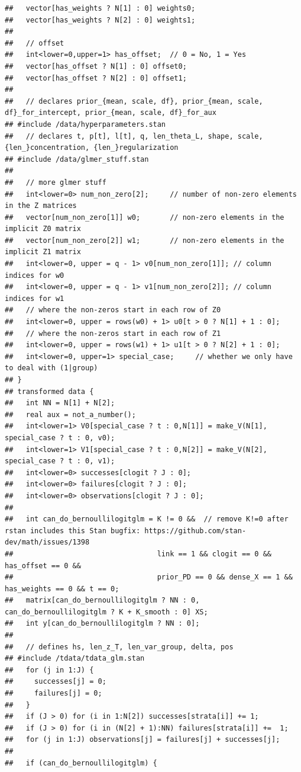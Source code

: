 \documentclass[
]{article}
\begin{document}
\begin{verbatim}
##   vector[has_weights ? N[1] : 0] weights0;
##   vector[has_weights ? N[2] : 0] weights1;
##   
##   // offset
##   int<lower=0,upper=1> has_offset;  // 0 = No, 1 = Yes
##   vector[has_offset ? N[1] : 0] offset0;
##   vector[has_offset ? N[2] : 0] offset1;
##   
##   // declares prior_{mean, scale, df}, prior_{mean, scale, df}_for_intercept, prior_{mean, scale, df}_for_aux
## #include /data/hyperparameters.stan
##   // declares t, p[t], l[t], q, len_theta_L, shape, scale, {len_}concentration, {len_}regularization
## #include /data/glmer_stuff.stan
## 
##   // more glmer stuff
##   int<lower=0> num_non_zero[2];     // number of non-zero elements in the Z matrices
##   vector[num_non_zero[1]] w0;       // non-zero elements in the implicit Z0 matrix
##   vector[num_non_zero[2]] w1;       // non-zero elements in the implicit Z1 matrix
##   int<lower=0, upper = q - 1> v0[num_non_zero[1]]; // column indices for w0
##   int<lower=0, upper = q - 1> v1[num_non_zero[2]]; // column indices for w1
##   // where the non-zeros start in each row of Z0
##   int<lower=0, upper = rows(w0) + 1> u0[t > 0 ? N[1] + 1 : 0];  
##   // where the non-zeros start in each row of Z1
##   int<lower=0, upper = rows(w1) + 1> u1[t > 0 ? N[2] + 1 : 0];  
##   int<lower=0, upper=1> special_case;     // whether we only have to deal with (1|group)
## }
## transformed data {
##   int NN = N[1] + N[2];
##   real aux = not_a_number();
##   int<lower=1> V0[special_case ? t : 0,N[1]] = make_V(N[1], special_case ? t : 0, v0);
##   int<lower=1> V1[special_case ? t : 0,N[2]] = make_V(N[2], special_case ? t : 0, v1);
##   int<lower=0> successes[clogit ? J : 0];
##   int<lower=0> failures[clogit ? J : 0];
##   int<lower=0> observations[clogit ? J : 0];
## 
##   int can_do_bernoullilogitglm = K != 0 &&  // remove K!=0 after rstan includes this Stan bugfix: https://github.com/stan-dev/math/issues/1398
##                                  link == 1 && clogit == 0 && has_offset == 0 && 
##                                  prior_PD == 0 && dense_X == 1 && has_weights == 0 && t == 0;
##   matrix[can_do_bernoullilogitglm ? NN : 0, can_do_bernoullilogitglm ? K + K_smooth : 0] XS;
##   int y[can_do_bernoullilogitglm ? NN : 0];
## 
##   // defines hs, len_z_T, len_var_group, delta, pos
## #include /tdata/tdata_glm.stan
##   for (j in 1:J) {
##     successes[j] = 0;
##     failures[j] = 0;
##   }
##   if (J > 0) for (i in 1:N[2]) successes[strata[i]] += 1;
##   if (J > 0) for (i in (N[2] + 1):NN) failures[strata[i]] +=  1;
##   for (j in 1:J) observations[j] = failures[j] + successes[j];
## 
##   if (can_do_bernoullilogitglm) {

\end{verbatim}
\end{document}
